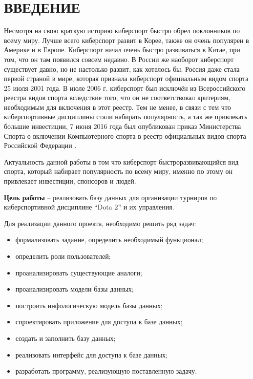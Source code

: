 \chapter*{ВВЕДЕНИЕ}

Несмотря на свою краткую историю киберспорт быстро обрел поклонников по всему миру. Лучше всего киберспорт развит в Корее, также он очень популярен в Америке и в Европе. Киберспорт начал очень быстро развиваться в Китае, при том, что он там появился совсем недавно. В России же наоборот киберспорт существует давно, но не настолько развит, как хотелось бы. Россия даже стала первой страной в мире, которая признала киберспорт официальным видом спорта 25 июля 2001 года. В июле 2006 г. киберспорт был исключён из Всероссийского реестра видов спорта вследствие того, что он не соответствовал критериям, необходимым для включения в этот реестр. Тем не менее, в связи с тем что киберспортивные дисциплины стали набирать популярность, а так же привлекать большие инвестиции,  7 июня 2016 года был опубликован приказ Министерства Спорта о включении Компьютерного спорта в реестр официальных видов спорта Российской Федерации \cite{1}. 

Актуальность данной работы в том что киберспорт быстроразвивающийся вид спорта, который набирает популярность по всему миру, именно по этому он привлекает инвестиции, спонсоров и людей. 

\textbf{Цель работы} – реализовать базу данных 	для организации турниров по киберспортивной дисциплине “Dota 2” и их управления.

Для реализации данного проекта, необходимо решить ряд задач:
\begin{itemize}
	\item формализовать задание, определить необходимый функционал;
	\item определить роли пользователей;
	\item проанализировать существующие аналоги;
	\item проанализировать модели базы данных;
	\item построить инфологическую модель базы данных;
	\item спроектировать приложение для доступа к базе данных;
	\item создать и заполнить базу данных;
	\item реализовать интерфейс для доступа к базе данных;
	\item разработать программу, реализующую поставленную задачу.
\end{itemize}